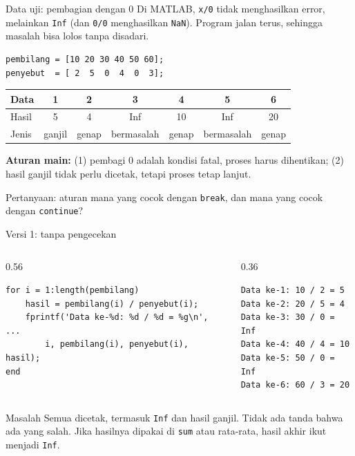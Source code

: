 \documentclass[aspectratio=169,10pt]{beamer}
\newcommand{\codesize}{\footnotesize}
\newcommand{\kode}[1]{\texttt{#1}}
\begin{document}
\begin{frame}[fragile]{Data uji: pembagian dengan 0}
  Di MATLAB, \kode{x/0} tidak menghasilkan error, melainkan \kode{Inf} (dan \kode{0/0} menghasilkan \kode{NaN}).
  Program jalan terus, sehingga masalah bisa lolos tanpa disadari.
\begin{lstlisting}
pembilang = [10 20 30 40 50 60];
penyebut  = [ 2  5  0  4  0  3];
\end{lstlisting}
  \vspace{4pt}
  \centering
  \begin{tabular}{@{}lcccccc@{}}
    \toprule
    Data & 1 & 2 & 3 & 4 & 5 & 6 \\
    \midrule
    Hasil & 5 & 4 & \alert{Inf} & 10 & \alert{Inf} & 20 \\
    Jenis & ganjil & genap & bermasalah & genap & bermasalah & genap \\
    \bottomrule
  \end{tabular}

  \vspace{8pt}
  \raggedright
  \textbf{Aturan main:} (1) pembagi 0 adalah kondisi \alert{fatal}, proses harus dihentikan;
  (2) hasil ganjil \alert{tidak perlu} dicetak, tetapi proses tetap lanjut.

  \vspace{4pt}
  Pertanyaan: aturan mana yang cocok dengan \kode{break}, dan mana yang cocok dengan \kode{continue}?
\end{frame}

\begin{frame}[fragile]{Versi 1: tanpa pengecekan}
  \renewcommand{\codesize}{\scriptsize}
  \begin{columns}[T]
    \begin{column}{0.56\textwidth}
\begin{lstlisting}
for i = 1:length(pembilang)
    hasil = pembilang(i) / penyebut(i);
    fprintf('Data ke-%d: %d / %d = %g\n', ...
        i, pembilang(i), penyebut(i), hasil);
end
\end{lstlisting}
    \end{column}
    \begin{column}{0.36\textwidth}
\begin{lstlisting}[style=out]
Data ke-1: 10 / 2 = 5
Data ke-2: 20 / 5 = 4
Data ke-3: 30 / 0 = Inf
Data ke-4: 40 / 4 = 10
Data ke-5: 50 / 0 = Inf
Data ke-6: 60 / 3 = 20
\end{lstlisting}
    \end{column}
  \end{columns}
  \vspace{6pt}
  \begin{alertblock}{Masalah}
    Semua dicetak, termasuk \kode{Inf} dan hasil ganjil. Tidak ada tanda bahwa ada yang salah.
    Jika hasilnya dipakai di \kode{sum} atau rata-rata, hasil akhir ikut menjadi \kode{Inf}.
  \end{alertblock}
\end{frame}
\end{document}
